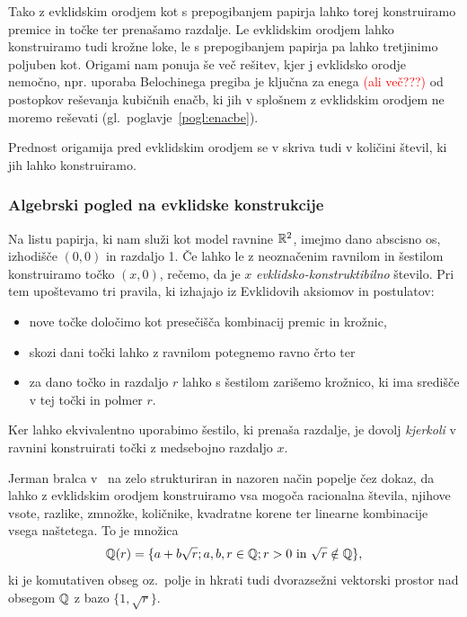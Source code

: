 Tako z evklidskim orodjem kot s prepogibanjem papirja lahko torej konstruiramo premice in točke ter prenašamo razdalje. Le evklidskim orodjem lahko konstruiramo tudi krožne loke, le s prepogibanjem papirja pa lahko tretjinimo poljuben kot. Origami nam ponuja še več rešitev, kjer j evklidsko orodje nemočno, npr. uporaba Belochinega pregiba je ključna za enega \textcolor{red}{(ali več???)} od postopkov reševanja kubičnih enačb, ki jih v splošnem z evklidskim orodjem ne moremo reševati (gl.\ poglavje~\ref{pogl:enacbe}).

Prednost origamija pred evklidskim orodjem se v skriva tudi v količini števil, ki jih lahko konstruiramo.

\subsubsection{Algebrski pogled na evklidske konstrukcije}

\begin{definicija}
    Na listu papirja, ki nam služi kot model ravnine $\mathbb R^2$, imejmo dano abscisno os, izhodišče $(0,0)$ in razdaljo 1. Če lahko le z neoznačenim ravnilom in šestilom konstruiramo točko $(x,0)$, rečemo, da je $x$ \emph{evklidsko-konstruktibilno} število. Pri tem upoštevamo tri pravila, ki izhajajo iz Evklidovih aksiomov in postulatov:
    \begin{itemize}
        \item nove točke določimo kot presečišča kombinacij premic in krožnic,
        \item skozi dani točki lahko z ravnilom potegnemo ravno črto ter
        \item za dano točko in razdaljo $r$ lahko s šestilom zarišemo krožnico, ki ima središče v tej točki in polmer $r$.
    \end{itemize}
\end{definicija}

\begin{opomba}
    Ker lahko ekvivalentno uporabimo šestilo, ki prenaša razdalje, je dovolj \emph{kjerkoli} v ravnini konstruirati točki z medsebojno razdaljo $x$.
\end{opomba}

Jerman bralca v~\cite{jerman1998} na zelo strukturiran in nazoren način popelje čez dokaz, da lahko z evklidskim orodjem konstruiramo vsa mogoča racionalna števila, njihove vsote, razlike, zmnožke, količnike, kvadratne korene ter linearne kombinacije vsega naštetega. To je množica
$$
    \mathbb Q(r) = \{ a + b \sqrt{r}; a, b, r \in \mathbb Q; r > 0 \text{ in } \sqrt{r} \notin \mathbb Q \},
$$
ki je komutativen obseg oz.\ polje in hkrati tudi dvorazsežni vektorski prostor nad obsegom $\mathbb Q$ z bazo $ \{1, \sqrt{r} \} $.

